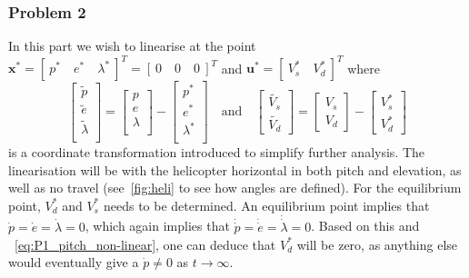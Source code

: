 \subsubsection{Problem 2}
In this part we wish to linearise at the point $\mathbf{x^*} = [~p^*\quad e^*\quad\lambda^*~]^T =
[~0\quad0\quad0~]^T$ and $\mathbf{u^*} = [~V_s^*\quad V_d^*~]^T$ where
\begin{equation*}
    \begin{bmatrix}
        \tilde{p} \\
        \tilde{e} \\
        \tilde{\lambda} \\
    \end{bmatrix}
    =
    \begin{bmatrix}
        p \\
        e \\
        \lambda \\
    \end{bmatrix}
    -
    \begin{bmatrix}
        p^* \\
        e^* \\
        \lambda^* \\
    \end{bmatrix}
\quad\text{and}\quad
    \begin{bmatrix}
        \tilde{V_s} \\
        \tilde{V_d} 
    \end{bmatrix}
    =
    \begin{bmatrix}
        V_s \\
        V_d
    \end{bmatrix}
    -
    \begin{bmatrix}
        V_s^* \\
        V_d^*
    \end{bmatrix}
\end{equation*}
is a coordinate transformation introduced to simplify further analysis. The linearisation will be with the helicopter horizontal in both pitch and elevation, as well as no travel (see~\cref{fig:heli} to see how angles are defined). For the equilibrium point, $V_d^*$ and $V_s^*$ needs to be determined. An equilibrium point implies that $\dot{p}=\dot{e}=\dot{\lambda}=0$, which again implies that $\dot{\dot{p}}=\dot{\dot{e}}=\dot{\dot{\lambda}}=0$. Based on this and ~\cref{eq:P1_pitch_non-linear}, one can deduce that $V_d^*$ will be zero, as anything else would eventually give a $\dot{p} \neq 0$ as $t\to\infty$.

